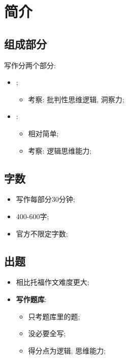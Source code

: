 \chapter{简介}

\section{组成部分}

  写作分两个部分:

  \begin{itemize}
    \item \textbf{};
    \begin{itemize}
      \item 考察: 批判性思维逻辑, 洞察力;
    \end{itemize}

    \item \textbf{}:
    \begin{itemize}
      \item 相对简单;
      \item 考察: 逻辑思维能力;
    \end{itemize}
  \end{itemize}

\section{字数}

  \begin{itemize}
    \item 写作每部分30分钟;
    \item 400-600字;
    \item 官方不限定字数;
  \end{itemize}

\section{出题}

  \begin{itemize}
    \item 相比托福作文难度更大;
    \item \textbf{写作题库}:
    \begin{itemize}
      \item 只考题库里的题;
      \item 没必要全写;
      \item 得分点为逻辑, 思维能力;
    \end{itemize}
  \end{itemize}

